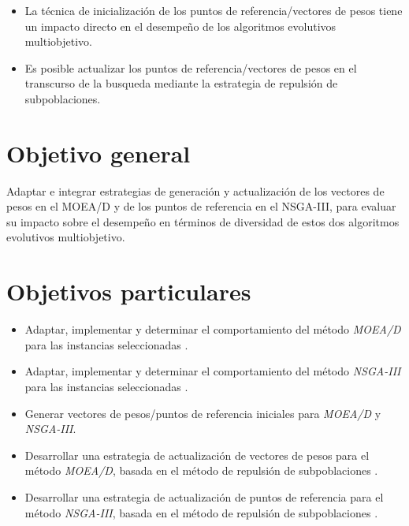 \begin{itemize}
 \item La técnica de inicialización de los puntos de referencia/vectores de pesos tiene un impacto directo en el desempeño de los algoritmos evolutivos multiobjetivo.
 \item Es posible actualizar los puntos de referencia/vectores de pesos en el transcurso  de la busqueda mediante la estrategia de repulsión de subpoblaciones.
\end{itemize}

\section{Objetivo general}

Adaptar e integrar estrategias de generación y actualización de los vectores de pesos en el MOEA/D y de los puntos de referencia en el NSGA-III, para  evaluar su impacto sobre el desempeño en términos de diversidad de estos dos algoritmos evolutivos multiobjetivo.

\section{Objetivos particulares}

\begin{itemize}

\item Adaptar, implementar y determinar el comportamiento del método \emph{MOEA/D} para las instancias seleccionadas \cite{zhang2008multiobjective}.
 
\item Adaptar, implementar y determinar el comportamiento del método \emph{NSGA-III} para las instancias seleccionadas \cite{zhang2008multiobjective}.

\item Generar vectores de pesos/puntos de referencia iniciales para \emph{MOEA/D} y \emph{NSGA-III}.

\item Desarrollar una estrategia de actualización de vectores de pesos para el método \emph{MOEA/D}, basada en el método de repulsión de subpoblaciones \cite{ahrari2016multimodal}.

\item Desarrollar una estrategia de actualización de puntos de referencia para el método \emph{NSGA-III}, basada en el método de repulsión de subpoblaciones \cite{ahrari2016multimodal}.
  


\end{itemize}

